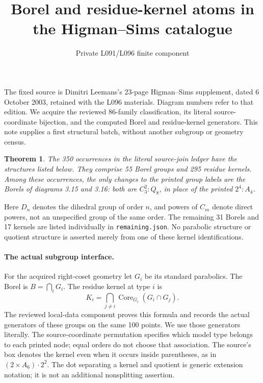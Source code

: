 \documentclass[11pt]{article}
\title{Borel and residue-kernel atoms in the Higman--Sims catalogue}
\author{Private L091/L096 finite component}\date{}
\newtheorem{theorem}{Theorem}\newtheorem{lemma}{Lemma}
\begin{document}
\maketitle
The fixed source is Dimitri Leemans's 23-page Higman--Sims supplement,
dated 6 October 2003, retained with the L096 materials. Diagram numbers
refer to that edition. We acquire the reviewed 86-family classification,
its literal source-coordinate bijection, and the computed Borel and
residue-kernel generators. This note supplies a first structural batch,
without another subgroup or geometry census.

\begin{theorem}
The 350 occurrences in the literal source-join ledger have the structures
listed below. They comprise 55 Borel groups and 295 residue kernels.
Among these occurrences, the only changes to the printed group labels
are the Borels of diagrams 3.15 and 3.16: both are $C_3^2:Q_8$, in place
of the printed $2^4:A_4$.
\end{theorem}
\begin{center}\small\end{center}
Here $D_n$ denotes the dihedral group of order $n$, and powers of $C_m$
denote direct powers, not an unspecified group of the same order.
The remaining 31 Borels and 17 kernels are listed individually in
\texttt{remaining.json}. No parabolic structure or quotient structure is
asserted merely from one of these kernel identifications.

\newpage
\paragraph{The actual subgroup interface.}
For the acquired right-coset geometry let $G_i$ be its standard parabolics.
The Borel is $B=\bigcap_iG_i$. The residue kernel at type $i$ is
\[
 K_i=\bigcap_{j\ne i}\operatorname{Core}_{G_i}(G_i\cap G_j).
\]
The reviewed local-data component proves this formula and records the
actual generators of these groups on the same 100 points. We use those
generators literally. The source-coordinate permutation specifies which
model type belongs to each printed node; equal orders do not choose that
association. The source's box denotes the kernel even when it occurs
inside parentheses, as in $(\boxed{2}\times A_6)\mathbin{\cdot}2^2$.
The dot separating a kernel and quotient is generic extension notation;
it is not an additional nonsplitting assertion.
\end{document}
